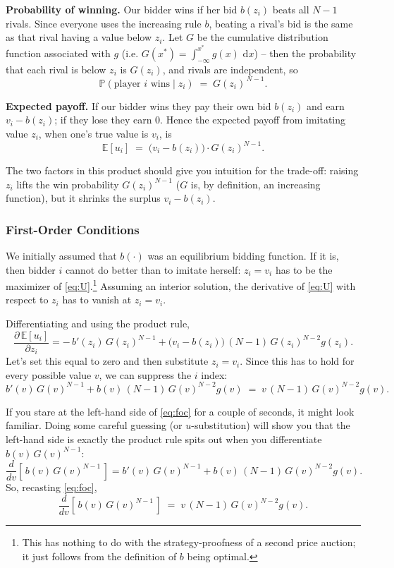 \documentclass[12pt]{article}
\newcommand{\del}{\partial}
\newcommand{\bbP}{\mathbb{P}}
\newcommand{\bbE}{\mathbb{E}}
\theoremstyle{definition}
\theoremstyle{remark}
\theoremstyle{plain}                          %
\begin{document}
\noindent
\textbf{Probability of winning.} Our bidder wins if her bid $b(z_i)$ beats all $N-1$ rivals. Since everyone uses the increasing rule $b$, beating a rival's bid is the same as that rival having a value below $z_i$. Let $G$ be the cumulative distribution function associated with $g$ (i.e. $G(x^*)=\int_{-\infty}^{x^*} g(x) \text{ d}x$) -- then the probability that each rival is below $z_i$ is $G(z_i)$, and rivals are independent, so
\[
  \bbP(\text{player } i \text{ wins} \mid  z_i) \;=\; G(z_i)^{\,N-1}.
\]

\noindent
\textbf{Expected payoff.} If our bidder wins they pay their own bid $b(z_i)$ and earn $v_i - b(z_i)$; if they lose they earn $0$. Hence the expected payoff from imitating value $z_i$, when one's true value is $v_i$, is
\begin{equation}\label{eq:U}
  \bbE[u_i] \;=\; \big(v_i - b(z_i)\big) \cdot G(z_i)^{N-1}.
\end{equation}

The two factors in this product should give you intuition for the trade-off: raising $z_i$ lifts the win probability $G(z_i)^{N-1}$ ($G$ is, by definition, an increasing function), but it shrinks the surplus $v_i - b(z_i)$.

\subsubsection{First-Order Conditions}

We initially assumed that $b(\cdot)$ was an equilibrium bidding function. If it is, then bidder $i$ cannot do better than to imitate herself: $z_i = v_i$ has to be the maximizer of \eqref{eq:U}.\footnote{This has nothing to do with the strategy-proofness of a second price auction; it just follows from the definition of $b$ being optimal.} Assuming an interior solution, the derivative of \eqref{eq:U} with respect to $z_i$ has to vanish at $z_i=v_i$.

Differentiating and using the product rule,
\[
  \frac{\del \, \bbE[u_i]}{\del z_i}
  = -\,b'(z_i)\,G(z_i)^{N-1}
    + \big(v_i - b(z_i)\big)\,(N-1)\,G(z_i)^{N-2} g(z_i).
\]
Let's set this equal to zero and then substitute $z_i = v_i$. Since this has to hold for every possible value $v$, we can suppress the $i$ index:
\begin{equation}\label{eq:foc}
  b'(v)\,G(v)^{N-1}
   + b(v)\,(N-1)\,G(v)^{N-2} g(v)
  \;=\; v\,(N-1)\,G(v)^{N-2} g(v).
\end{equation}

If you stare at the left-hand side of \eqref{eq:foc} for a couple of seconds, it might look familiar. Doing some careful guessing (or $u$-substitution) will show you that the left-hand side is exactly the product rule spits out when you differentiate $b(v)\,G(v)^{N-1}$:
\[
  \frac{d}{dv}\!\left[\, b(v)\,G(v)^{N-1} \,\right]
  = b'(v)\,G(v)^{N-1} + b(v)\,(N-1)\,G(v)^{N-2} g(v).
\]
So, recasting \eqref{eq:foc},
\begin{equation}\label{eq:exact}
  \frac{d}{dv}\!\left[\, b(v)\,G(v)^{N-1} \,\right]
  \;=\; v\,(N-1)\,G(v)^{N-2} g(v).
\end{equation}
\end{document}
